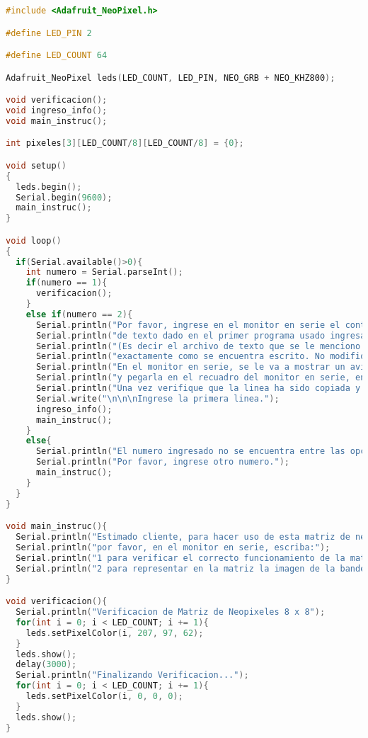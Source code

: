 \documentclass{article}
\begin{document}
\begin{lstlisting}[language=C++, label=error_guardarints]
#include <Adafruit_NeoPixel.h>

#define LED_PIN 2

#define LED_COUNT 64

Adafruit_NeoPixel leds(LED_COUNT, LED_PIN, NEO_GRB + NEO_KHZ800);

void verificacion();
void ingreso_info();
void main_instruc();

int pixeles[3][LED_COUNT/8][LED_COUNT/8] = {0};

void setup()
{
  leds.begin();
  Serial.begin(9600);
  main_instruc();
}

void loop()
{
  if(Serial.available()>0){
    int numero = Serial.parseInt();
    if(numero == 1){
      verificacion();
    }
    else if(numero == 2){
      Serial.println("Por favor, ingrese en el monitor en serie el contenido del archivo");
      Serial.println("de texto dado en el primer programa usado ingresando linea por linea,");
      Serial.println("(Es decir el archivo de texto que se le menciono mantener abierto para este segundo programa");
      Serial.println("exactamente como se encuentra escrito. No modifique nada del contenido.");
      Serial.println("En el monitor en serie, se le va a mostrar un aviso para poder copiar 1 linea");
      Serial.println("y pegarla en el recuadro del monitor en serie, en su parte inferior, habilitado para pegar dicha linea.");
      Serial.println("Una vez verifique que la linea ha sido copiada y pegada correctamente, oprima enter para ingresarla.");
      Serial.write("\n\n\nIngrese la primera linea.");
      ingreso_info();
      main_instruc();
    }
    else{
      Serial.println("El numero ingresado no se encuentra entre las opciones dadas.");
      Serial.println("Por favor, ingrese otro numero.");
      main_instruc();
    }
  }
}

void main_instruc(){
  Serial.println("Estimado cliente, para hacer uso de esta matriz de neopixeles,");
  Serial.println("por favor, en el monitor en serie, escriba:");
  Serial.println("1 para verificar el correcto funcionamiento de la matriz");
  Serial.println("2 para representar en la matriz la imagen de la bandera escogida en el anterior programa");
}

void verificacion(){
  Serial.println("Verificacion de Matriz de Neopixeles 8 x 8");
  for(int i = 0; i < LED_COUNT; i += 1){
    leds.setPixelColor(i, 207, 97, 62);
  }
  leds.show();
  delay(3000);
  Serial.println("Finalizando Verificacion...");
  for(int i = 0; i < LED_COUNT; i += 1){
    leds.setPixelColor(i, 0, 0, 0);
  }
  leds.show();
}


\end{lstlisting}
\end{document}
